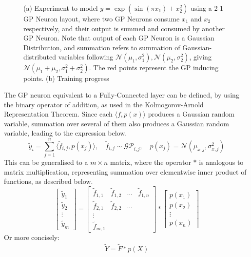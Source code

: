 \documentclass{article}
\begin{document}
\begin{figure}[t]
    \caption{(a) Experiment to model $y=\exp(\sin(\pi x_1)+x_2^2)$ using a 2-1 GP Neuron layout, where two GP Neurons consume $x_1$ and $x_2$ respectively, and their output is summed and consumed by another GP Neuron. Note that output of each GP Neuron is a Gaussian Distribution, and summation refers to summation of Gaussian-distributed variables following $\mathcal{N}(\mu_1,\sigma_1^2),\mathcal{N}(\mu_2,\sigma_2^2)$, giving $\mathcal{N}(\mu_1+\mu_2, \sigma_1^2 + \sigma_2^2)$. The red points represent the GP inducing points. (b) Training progress}
    \label{fig:simple_model}
\end{figure}


The GP neuron equivalent to a Fully-Connected layer can be defined, by using the binary operator of addition, as used in the Kolmogorov-Arnold Representation Theorem. Since each $\langle f, p(x)\rangle$ produces a Gaussian random variable, summation over several of them also produces a Gaussian random variable, leading to the expression below.
\begin{equation}
    \tilde{y}_i = \sum_{j=1}^{n} \langle \tilde{f}_{i,j}, p(x_j)\rangle, \quad \tilde{f}_{i,j}\sim\mathcal{GP}_{i,j}, \quad p(x_j)=\mathcal{N}(\mu_{x,j},\sigma_{x,j}^2)
\end{equation}
This can be generalised to a $m\times n$ matrix, where the operator $\ast$ is analogous to matrix multiplication, representing summation over elementwise inner product of functions, as described below.
\begin{equation}
    \begin{bmatrix}
        \tilde{y}_1 \\ \tilde{y}_2 \\ \vdots \\ \tilde{y}_m
    \end{bmatrix} =
    \begin{bmatrix}
        \tilde{f}_{1,1} & \tilde{f}_{1,2} & \hdots & \tilde{f}_{1,n} \\
        \tilde{f}_{2,1} & \tilde{f}_{2,2} & \hdots \\
        \vdots \\
        \tilde{f}_{m,1}
    \end{bmatrix}\ast
    \begin{bmatrix}
        p(x_1) \\ p(x_2) \\ \vdots \\ p(x_n)
    \end{bmatrix}
\end{equation}
Or more concisely:
\begin{equation}
    \begin{aligned}
        \tilde{Y}=\tilde{F}\ast p(X)
    \end{aligned}
\end{equation}
\end{document}
